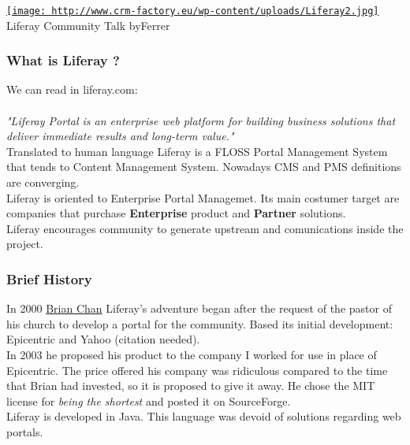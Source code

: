 
\begin{tabular}\href{http://www.crm-factory.eu/wp-content/uploads/Liferay2.jpg}{
\texttt{[image: http://www.crm-factory.eu/wp-content/uploads/Liferay2.jpg]}} \\ 
Liferay Community Talk by\nolinebreakJorge Ferrer
\end{tabular}

\subsubsection{ What is Liferay ?} We can read in liferay.com:
\\
\\\textit{"Liferay Portal is an enterprise web platform for building business solutions that deliver immediate results and long-term value."}\textit{
\\} Translated to human language Liferay is a FLOSS Portal Management System that tends to Content Management System. Nowadays CMS and PMS definitions are converging.
\\ Liferay is oriented to Enterprise Portal Managemet. Its main costumer target are companies that purchase \textbf{Enterprise} product and \textbf{Partner} solutions.
\\ Liferay encourages community to generate upstream and comunications inside the project.

\subsubsection{ Brief History} In 2000 \href{http://www.liferay.com/about-us/leadership/bchan}{Brian Chan} Liferay's adventure began after the request of the pastor of his church to develop a portal for the community. Based its initial development: Epicentric and Yahoo (citation needed).
\\ In 2003 he proposed his product to the company I worked for use in place of Epicentric. The price offered his company was ridiculous compared to the time that Brian had invested, so it is proposed to give it away. He chose the MIT license for \textit{being the shortest} and posted it on SourceForge.
\\ Liferay is developed in Java. This language was devoid of solutions regarding web portals.

